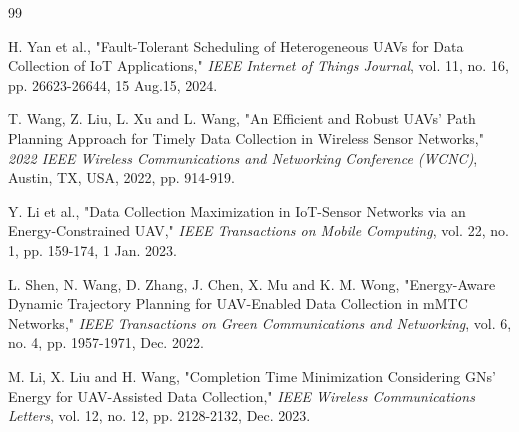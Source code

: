 \documentclass[journal]{IEEEtran}
\begin{document}
\begin{thebibliography}{99}
%        
%        

     H. Yan et al., "Fault-Tolerant Scheduling of Heterogeneous UAVs for Data Collection of IoT Applications," \textit{IEEE Internet of Things Journal}, vol. 11, no. 16, pp. 26623-26644, 15 Aug.15, 2024.
        
     T. Wang, Z. Liu, L. Xu and L. Wang, "An Efficient and Robust UAVs’ Path Planning Approach for Timely Data Collection in Wireless Sensor Networks," \textit{2022 IEEE Wireless Communications and Networking Conference (WCNC)}, Austin, TX, USA, 2022, pp. 914-919.
        
     Y. Li et al., "Data Collection Maximization in IoT-Sensor Networks via an Energy-Constrained UAV," \textit{IEEE Transactions on Mobile Computing}, vol. 22, no. 1, pp. 159-174, 1 Jan. 2023.
        
     L. Shen, N. Wang, D. Zhang, J. Chen, X. Mu and K. M. Wong, "Energy-Aware Dynamic Trajectory Planning for UAV-Enabled Data Collection in mMTC Networks," \textit{IEEE Transactions on Green Communications and Networking}, vol. 6, no. 4, pp. 1957-1971, Dec. 2022. 
        
     M. Li, X. Liu and H. Wang, "Completion Time Minimization Considering GNs’ Energy for UAV-Assisted Data Collection," \textit{IEEE Wireless Communications Letters}, vol. 12, no. 12, pp. 2128-2132, Dec. 2023. 
        

\end{thebibliography}
\end{document}
